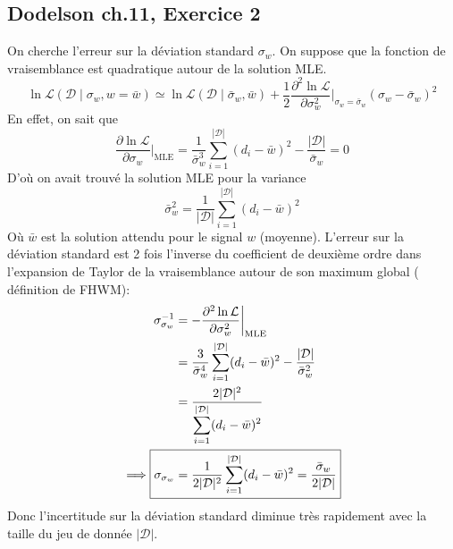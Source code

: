 \documentclass{article}
\numberwithin{equation}{section}
\begin{document}
\subsection{Dodelson ch.11, Exercice 2}
On cherche l'erreur sur la déviation standard $\sigma_w$. On suppose que la 
fonction de vraisemblance est quadratique autour de la solution MLE. 
\[
        \ln \mathcal{L}(\mathcal{\mathcal{D}} \mid \sigma_w, w=\bar{w}) \simeq 
        \ln \mathcal{L}(\mathcal{D} \mid \bar{\sigma}_w, \bar{w}) 
        + \frac{1}{2}\frac{\partial^2 \ln \mathcal{L}}{\partial \sigma_w^2} 
        \bigg|_{\sigma_w=\bar{\sigma}_w} (\sigma_w - \bar{\sigma}_w)^{2}
\]
En effet, on sait que
\[
        \frac{\partial \ln \mathcal{L}}{\partial \sigma_w}\bigg|_{\text{MLE}} = 
        \frac{1}{\bar{\sigma}_w^{3}}\sum_{i=1}^{|\mathcal{D}|}(d_i - \bar{w})^{2} - 
        \frac{|\mathcal{D}|}{\bar{\sigma}_w} = 0
\]
D'où on avait trouvé la solution MLE pour la variance
\[
        \bar{\sigma}^2_w = 
        \frac{1}{|\mathcal{D}|}\sum_{i=1}^{|\mathcal{D}|}(d_i - \bar{w})^{2}
\]
Où $\bar{w}$ est la solution attendu pour le signal $w$ (moyenne). L'erreur 
sur la déviation standard est 2 fois l'inverse du 
coefficient de deuxième ordre dans 
l'expansion de Taylor de la vraisemblance autour de son maximum global (
définition de FHWM):
\begingroup
\allowdisplaybreaks
\begin{align*}
        \sigma_{\sigma_w}^{-1} &= -\frac{\partial^2 \ln \mathcal{L}}{\partial \sigma_w^2}
        \bigg|_{\text{MLE}} \\
                          &= \frac{3}{\bar{\sigma}_w^4}\sum_{i=1}^{|\mathcal{D}|}
        (d_i - \bar{w})^{2} - \frac{|\mathcal{D}|}{\bar{\sigma}_w^{2}} \\
                          &= \frac{2|\mathcal{D}|^2}{
                          \displaystyle \sum_{i=1}^{|\mathcal{D}|}(d_i - \bar{w})^{2}} \\
        \implies \Aboxed{  \sigma_{\sigma_w}  &= \frac{1}{2|\mathcal{D}|^{2}}
        \sum_{i = 1}^{|\mathcal{D}|}(d_i -\bar{w})^{2} = \frac{\bar{\sigma}_w}{2|\mathcal{D}|}}
\end{align*}
\endgroup
Donc l'incertitude sur la déviation standard diminue très rapidement 
avec la taille du jeu de donnée $|\mathcal{D}|$.
\end{document}

